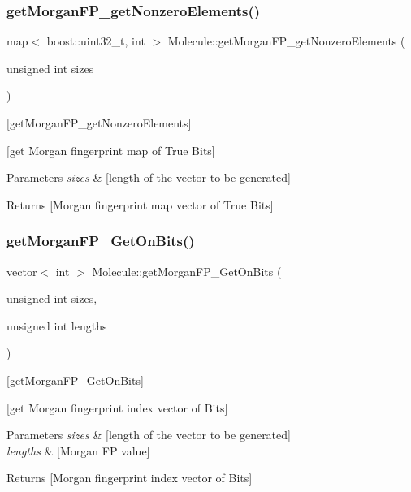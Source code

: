 \subsubsection{\texorpdfstring{get\+Morgan\+F\+P\+\_\+get\+Nonzero\+Elements()}{getMorganFP\_getNonzeroElements()}}
{\footnotesize\ttfamily map$<$ boost\+::uint32\+\_\+t, int $>$ Molecule\+::get\+Morgan\+F\+P\+\_\+get\+Nonzero\+Elements (\begin{DoxyParamCaption}\item[{unsigned int}]{sizes }\end{DoxyParamCaption})}



\mbox{[}get\+Morgan\+F\+P\+\_\+get\+Nonzero\+Elements\mbox{]} 

\mbox{[}get Morgan fingerprint map of True Bits\mbox{]}


\begin{DoxyParams}{Parameters}
{\em sizes} & \mbox{[}length of the vector to be generated\mbox{]} \\
\hline
\end{DoxyParams}
\begin{DoxyReturn}{Returns}
\mbox{[}Morgan fingerprint map vector of True Bits\mbox{]} 
\end{DoxyReturn}
\mbox{\label{class_molecule_a1f719071d2a80ebe43599cd357767a19}} 
\subsubsection{\texorpdfstring{get\+Morgan\+F\+P\+\_\+\+Get\+On\+Bits()}{getMorganFP\_GetOnBits()}}
{\footnotesize\ttfamily vector$<$ int $>$ Molecule\+::get\+Morgan\+F\+P\+\_\+\+Get\+On\+Bits (\begin{DoxyParamCaption}\item[{unsigned int}]{sizes,  }\item[{unsigned int}]{lengths }\end{DoxyParamCaption})}



\mbox{[}get\+Morgan\+F\+P\+\_\+\+Get\+On\+Bits\mbox{]} 

\mbox{[}get Morgan fingerprint index vector of Bits\mbox{]}


\begin{DoxyParams}{Parameters}
{\em sizes} & \mbox{[}length of the vector to be generated\mbox{]} \\
\hline
{\em lengths} & \mbox{[}Morgan FP value\mbox{]} \\
\hline
\end{DoxyParams}
\begin{DoxyReturn}{Returns}
\mbox{[}Morgan fingerprint index vector of Bits\mbox{]} 
\end{DoxyReturn}
\mbox{\label{class_molecule_a8546f6429ed2147b33c9d61fc192513c}} 
